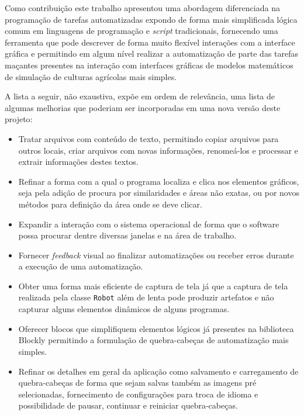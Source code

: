 \documentclass[tg]{mdtufsm}
\begin{document}
            Como contribuição este trabalho apresentou uma abordagem diferenciada na programação de tarefas automatizadas expondo de forma mais simplificada lógica comum em linguagens de programação e \emph{script} tradicionais, fornecendo uma ferramenta que pode descrever de forma muito flexível interações com a interface gráfica e permitindo em algum nível realizar a automatização de parte das tarefas maçantes presentes na interação com interfaces gráficas de modelos matemáticos de simulação de culturas agrícolas mais simples.

            A lista a seguir, não exaustiva, expõe em ordem de relevância, uma lista  de algumas melhorias que poderiam ser incorporadas em uma nova versão deste projeto:

            \begin{itemize}
            	\item Tratar arquivos com conteúdo de texto, permitindo copiar arquivos para outros locais, criar arquivos com novas informações, renomeá-los e processar e extrair informações destes textos.
                \item Refinar a forma com a qual o programa localiza e clica nos elementos gráficos, seja pela adição de procura por similaridades e áreas não exatas, ou por novos métodos para definição da área onde se deve clicar.
                \item Expandir a interação com o sistema operacional de forma que o software possa procurar dentre diversas janelas e na área de trabalho.
            	\item Fornecer \emph{feedback} visual ao finalizar automatizações ou receber erros durante a execução de uma automatização.
            	\item Obter uma forma mais eficiente de captura de tela já que a captura de tela realizada pela classe \texttt{Robot} além de lenta pode produzir artefatos e não capturar alguns elementos dinâmicos de alguns programas.
                \item Oferecer blocos que simplifiquem elementos lógicos já presentes na biblioteca Blockly permitindo a formulação de quebra-cabeças de automatização mais simples.
                \item Refinar os detalhes em geral da aplicação como salvamento e carregamento de quebra-cabeças de forma que sejam salvas também as imagens pré selecionadas, fornecimento de configurações para troca de idioma e possibilidade de pausar, continuar e reiniciar quebra-cabeças.
            \end{itemize}

	\setlength{\baselineskip}{\baselineskip}
	
	
\end{document}
